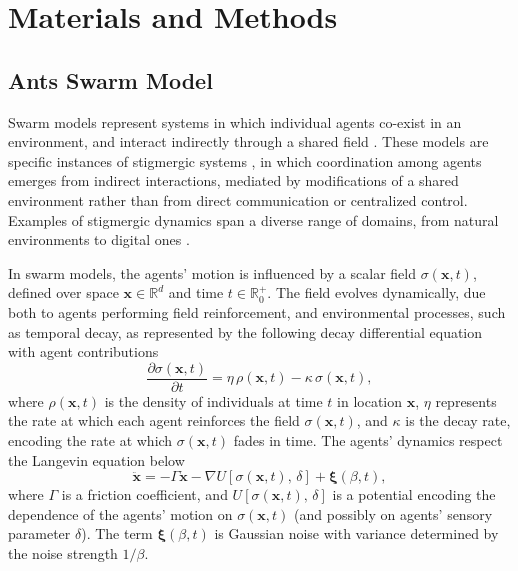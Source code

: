 \documentclass[openacc]{rsproca_new}
\begin{document}
\section{Materials and Methods}
\label{sec:Materials_and_methods}

\subsection{Ants Swarm Model}
\label{sec:Ants_swarmmodel}
Swarm models represent systems in which individual agents co-exist in an environment, and interact indirectly through a shared field \cite{patternformation}. These models are specific instances of stigmergic systems \cite{stigmergy}, in which coordination among agents emerges from indirect interactions, mediated by modifications of a shared environment rather than from direct communication or centralized control. Examples of stigmergic dynamics span a diverse range of domains, from natural environments %
\cite{herdability, slimemold} to digital ones %
\cite{wikistigmergy}. 

In swarm models, the agents' motion is influenced by a scalar field $\sigma(\pmb{x}, t)$, defined over space $\pmb{x} \in \mathbb{R}^d$ and time $t \in \mathbb{R}_{0}^{+}$. The field evolves dynamically, due both to agents performing field reinforcement, and environmental processes, such as temporal decay, as represented by the following decay differential equation with agent contributions
\begin{equation}
\label{Eq:sigma_xt}
    \frac{\partial \sigma(\pmb{x},t)}{\partial t} = \eta \,\rho(\pmb{x},t) - \kappa \, \sigma(\pmb{x},t),
\end{equation}
where $\rho(\pmb{x},t)$ is the density of individuals at time $t$ in location $\pmb{x}$, $\eta$ represents the rate at which each agent reinforces the field $\sigma(\pmb{x}, t)$, and $\kappa$ is the decay rate, encoding the rate at which $\sigma(\pmb{x}, t)$ fades in time. The agents' dynamics respect the Langevin equation below
\begin{equation}
\label{Eq:langevin}
    \ddot{\pmb{x}} = - \Gamma \dot{\pmb{x}} - \nabla U[\sigma(\pmb{x},t), \, \delta] + \pmb{\xi}(\beta,t),
\end{equation}
where $\Gamma$ is a friction coefficient, and $U[\sigma(\pmb{x},t), \, \delta]$ is a potential encoding the dependence of the agents' motion on $\sigma(\pmb{x}, t)$ (and possibly on agents' sensory parameter $\delta$). The term $\pmb{\xi}(\beta,t)$ is Gaussian noise with variance determined by the noise strength $1/\beta$.\\
\end{document}
